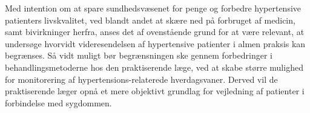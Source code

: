 Med intention om at spare sundhedsvæsenet for penge og forbedre hypertensive patienters livskvalitet, ved blandt andet at skære ned på forbruget af medicin, samt bivirkninger herfra, anses det af ovenstående grund for at være relevant, at undersøge hvorvidt videresendelsen af hypertensive patienter i almen praksis kan begrænses. Så vidt muligt bør begrænsningen ske gennem forbedringer i behandlingsmetoderne hos den praktiserende læge, ved at skabe større mulighed for monitorering af hypertensions-relaterede hverdagsvaner. Derved vil de praktiserende læger opnå et mere objektivt grundlag for vejledning af patienter i forbindelse med sygdommen.